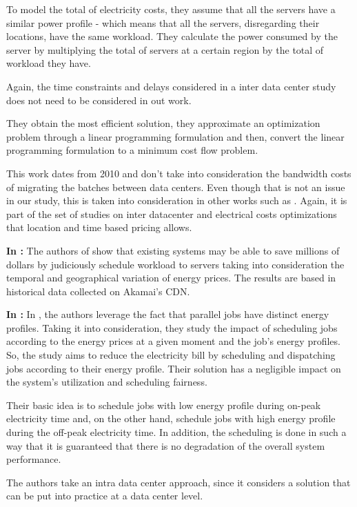 To model the total of electricity costs, they assume that all the servers have a
similar power profile - which means that all the servers, disregarding their
locations, have the same workload. They calculate the power consumed by the
server by multiplying the total of servers at a certain region by the total of
workload they have. 

Again, the time constraints and delays considered in a inter data center study
does not need to be considered in out work.

They obtain the most efficient solution, they approximate an optimization
problem through a linear programming formulation and then, convert the linear
programming formulation to a minimum cost flow problem. 

This work dates from 2010 and don't take into consideration the bandwidth costs
of migrating the batches between data centers. Even though that is not an issue
in our study, this is taken into consideration in other works such as
\cite{MIGRATION_CLOUD}. Again, it is part of the set of studies on inter
datacenter and electrical costs optimizations that location and time based 
pricing allows.



\textbf{In \cite{CUTTING_BILL}:}
The authors of \cite{CUTTING_BILL} show that existing systems may be able to
save millions of dollars by judiciously schedule workload to servers taking into
consideration the temporal and geographical variation of energy prices. The
results are based in historical data collected on Akamai's CDN. 


\textbf{In \cite{DYN_PRICING_HPC}:}
In \cite{DYN_PRICING_HPC}, the authors leverage the fact that parallel jobs have 
distinct energy profiles. Taking it into consideration, they study the impact of
scheduling jobs according to the energy prices at a given moment and the job's
energy profiles. So, the study aims to reduce the electricity bill by scheduling and
dispatching jobs according to their energy profile. Their solution has a
negligible impact on the system's utilization and scheduling fairness. 

Their basic idea is to schedule jobs with low energy profile during on-peak
electricity time and, on the other hand, schedule jobs with high energy profile
during the off-peak electricity time. In addition, the scheduling is done in
such a way that it is guaranteed that there is no degradation of the overall
system performance. 

The authors take an intra data center approach, since it considers a solution
that can be put into practice at a data center level.

